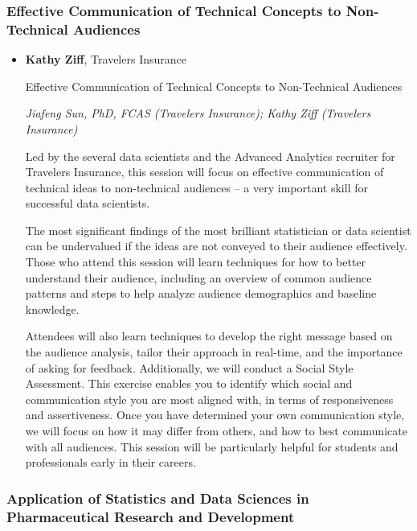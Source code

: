 \begin{itemize}
\end{itemize}

\subsubsection*{Effective Communication of Technical Concepts to Non-Technical Audiences}

\begin{itemize}
\item \textbf{Kathy Ziff}, Travelers Insurance

Effective Communication of Technical Concepts to Non-Technical Audiences

\emph{\footnotesize Jiafeng Sun, PhD, FCAS (Travelers Insurance); Kathy Ziff (Travelers Insurance)}

Led by the several data scientists and the Advanced Analytics recruiter for Travelers Insurance, this session will focus on effective communication of technical ideas to non-technical audiences – a very important skill for successful data scientists.  

The most significant findings of the most brilliant statistician or data scientist can be undervalued if the ideas are not conveyed to their audience effectively. Those who attend this session will learn techniques for how to better understand their audience, including an overview of common audience patterns and steps to help analyze audience demographics and baseline knowledge.  

Attendees will also learn techniques to develop the right message based on the audience analysis, tailor their approach in real-time, and the importance of asking for feedback. Additionally, we will conduct a Social Style Assessment.  This exercise enables you to identify which social and communication style you are most aligned with, in terms of responsiveness and assertiveness.  Once you have determined your own communication style, we will focus on how it may differ from others, and how to best communicate with all audiences. This session will be particularly helpful for students and professionals early in their careers. 

\end{itemize}

\subsubsection*{Application of Statistics and Data Sciences in Pharmaceutical Research and Development}


